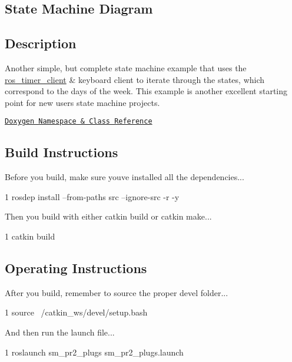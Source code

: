\subsection*{State Machine Diagram}



\subsection*{Description}

Another simple, but complete state machine example that uses the \hyperlink{namespaceros__timer__client}{ros\+\_\+timer\+\_\+client} \& keyboard client to iterate through the states, which correspond to the days of the week. This example is another excellent starting point for new users state machine projects.~\newline


\href{https://reelrbtx.github.io/SMACC_Documentation/master/html/namespacesm__pr2__plugs.html}{\tt Doxygen Namespace \& Class Reference}

\subsection*{Build Instructions}

Before you build, make sure you\textquotesingle{}ve installed all the dependencies...


\begin{DoxyCode}
1 rosdep install --from-paths src --ignore-src -r -y 
\end{DoxyCode}


Then you build with either catkin build or catkin make...


\begin{DoxyCode}
1 catkin build
\end{DoxyCode}


\subsection*{Operating Instructions}

After you build, remember to source the proper devel folder...


\begin{DoxyCode}
1 source ~/catkin\_ws/devel/setup.bash
\end{DoxyCode}


And then run the launch file...


\begin{DoxyCode}
1 roslaunch sm\_pr2\_plugs sm\_pr2\_plugs.launch
\end{DoxyCode}


